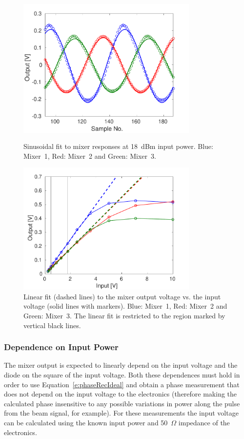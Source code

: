 \begin{figure}
  \centering
  \includegraphics[width=0.8\textwidth]{Figures/phaseMons/mixersFit18dBm}
  \caption{Sinusoidal fit to mixer responses at 18~dBm input power. Blue: Mixer~1, Red: Mixer~2 and Green: Mixer~3.}
  \label{f:mixersFit18dBm}
  \includegraphics[width=0.8\textwidth]{Figures/phaseMons/LinFitMixerVsVolts}
  \caption{Linear fit (dashed lines) to the mixer output voltage vs.  the input voltage (solid lines with markers). Blue: Mixer~1, Red: Mixer~2 and Green: Mixer~3. The linear fit is restricted to the region marked by vertical black lines.}
  \label{f:LinFitMixerVsVolts}
\end{figure}

\subsubsection{Dependence on Input Power}

The mixer output is expected to linearly depend on the input voltage and the diode on the square of the input voltage. Both these dependences must hold in order to use Equation~\ref{e:phaseRecIdeal} and obtain a phase measurement that does not depend on the input voltage to the electronics (therefore making the calculated phase insensitive to any possible variations in power along the pulse from the beam signal, for example). For these measurements the input voltage can be calculated using the known input power and 50~\(\Omega\) impedance of the electronics.

